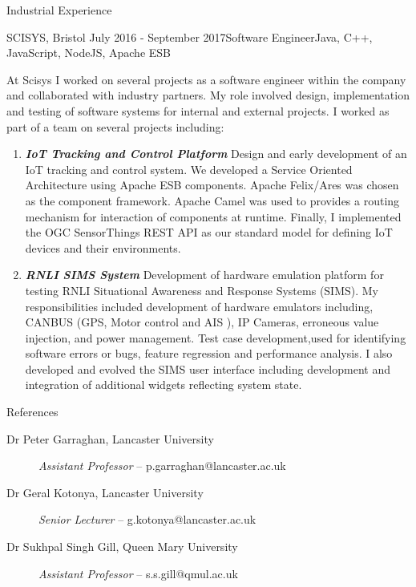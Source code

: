 \documentclass{resume} %
\begin{document}
\begin{rSection}{Industrial Experience}
	\begin{rSubsection}{SCISYS, Bristol} {July 2016 - September 2017}{Software Engineer}{Java, C++, JavaScript, NodeJS, Apache ESB}
		\item [] 
At Scisys I worked on several projects as a software engineer within the company and collaborated with industry partners. My role involved design, implementation and testing of software systems for internal and external projects.  I worked as part of a team on several projects including:
		\begin{enumerate}
			\item[] \textbf{\textit{IoT Tracking and Control Platform}} Design and early development of an IoT tracking and control system. We developed a  Service Oriented Architecture  using Apache ESB components.  Apache Felix/Ares was chosen as the component framework. Apache Camel was used to provides a routing mechanism for interaction of components at runtime. Finally, I implemented the OGC SensorThings REST API as our standard model for defining IoT devices and their environments.
			\item[] \textbf {\textit{RNLI SIMS System}} Development of hardware emulation platform for testing RNLI Situational Awareness and Response Systems (SIMS).  My responsibilities included development of hardware emulators including, CANBUS (GPS, Motor control and AIS ), IP Cameras,  erroneous value injection, and power management. Test case development,used for identifying software errors or bugs, feature regression and performance analysis. I also developed and evolved the SIMS user interface including development and integration of additional widgets reflecting system state.
		\end{enumerate}
	\end{rSubsection}
\end{rSection}

\begin{rSection}{References}
	\begin{description}
		\item[Dr Peter Garraghan, Lancaster University]
		\textit{Assistant Professor} -- p.garraghan@lancaster.ac.uk
		\item[Dr Geral Kotonya, Lancaster University]
		\textit{Senior Lecturer} -- g.kotonya@lancaster.ac.uk
		\item[Dr Sukhpal Singh Gill, Queen Mary University]
		\textit{Assistant Professor} -- s.s.gill@qmul.ac.uk
	\end{description}
\end{rSection}	
\end{document}
